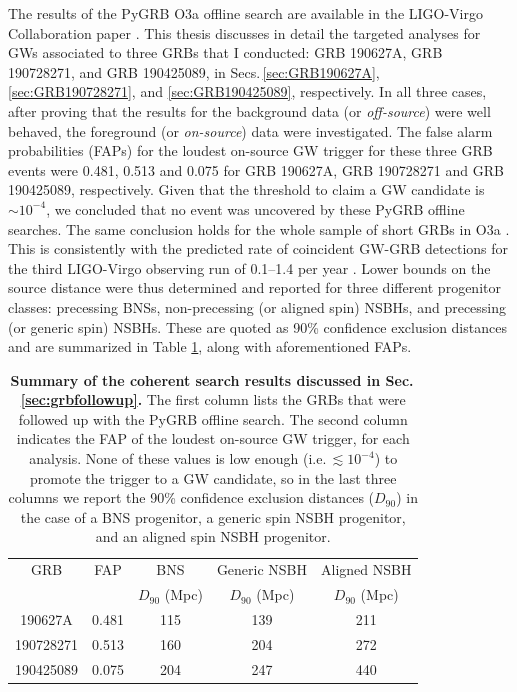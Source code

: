 \documentclass[binding=0.6cm, LaM]{sapthesis}
\begin{document}
        The results of the {\ttfamily PyGRB} O3a offline search are available in the LIGO-Virgo Collaboration paper \cite{43}.
	This thesis discusses in detail the targeted analyses for GWs associated to three GRBs that I conducted: 
	GRB 190627A, GRB 190728271, and GRB 190425089, in Secs.\,\ref{sec:GRB190627A}, \ref{sec:GRB190728271}, and \ref{sec:GRB190425089}, respectively.
	In all three cases, after proving that the results for the background data (or \emph{off-source}) were well behaved,
	the foreground (or \emph{on-source}) data were investigated.
	The false alarm probabilities (FAPs) for the loudest on-source GW trigger for these three GRB events were 
	0.481, 0.513 and 0.075 for GRB 190627A, GRB 190728271 and GRB 190425089, respectively. 
	Given that the threshold to claim a GW candidate is $\sim 10^{-4}$, 
	we concluded that no event was uncovered by these {\ttfamily PyGRB} offline searches.
        The same conclusion holds for the whole sample of short GRBs in O3a \cite{43}.
	This is consistently with the predicted rate of coincident GW-GRB detections 
	for the third LIGO-Virgo observing run of 0.1--1.4 per year \cite{55}.
	Lower bounds on the source distance were thus determined and reported for three different progenitor classes: 
	precessing BNSs, non-precessing (or aligned spin) NSBHs, and precessing (or generic spin) NSBHs.
        These are quoted as 90\% confidence exclusion distances and are summarized
	in Table \ref{table:1}, along with aforementioned FAPs.

\begin{table}[!t]
\centering
\begin{tabular}{ccccc}
\toprule[1.3pt]
\toprule[1.3pt]
GRB & FAP & BNS           & Generic NSBH   & Aligned NSBH  \\
    &     & $D_{90}$ (Mpc) & $D_{90}$ (Mpc) & $D_{90}$ (Mpc) \\
\midrule[1.1pt]
190627A   & 0.481 & 115 & 139 & 211 \\
190728271 & 0.513 & 160 & 204 & 272 \\
190425089 & 0.075 & 204 & 247 & 440 \\
\bottomrule[1.3pt]
\bottomrule[1.3pt]
\end{tabular}
\caption{{\bf Summary of the coherent search results discussed in Sec.\,\ref{sec:grbfollowup}.}  The first column lists the GRBs that were followed up with the {\ttfamily PyGRB} offline search.  The second column indicates the FAP of the loudest on-source GW trigger, for each analysis.  None of these values is low enough (i.e.\,$\lesssim 10^{-4}$) to promote the trigger to a GW candidate, so in the last three columns we report the 90\% confidence exclusion distances ($D_{90}$) in the case of a BNS progenitor, a generic spin NSBH progenitor, and an aligned spin NSBH progenitor.}
\label{table:1}
\end{table}
\end{document}
